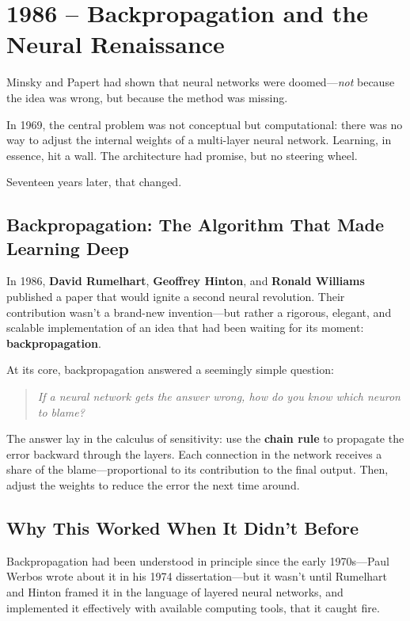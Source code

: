 \section{1986 – Backpropagation and the Neural Renaissance}

Minsky and Papert had shown that neural networks were doomed—\emph{not} because the idea was wrong, but because the method was missing.

In 1969, the central problem was not conceptual but computational: there was no way to adjust the internal weights of a multi-layer neural network. Learning, in essence, hit a wall. The architecture had promise, but no steering wheel.

Seventeen years later, that changed.

\subsection{Backpropagation: The Algorithm That Made Learning Deep}

In 1986, \textbf{David Rumelhart}, \textbf{Geoffrey Hinton}, and \textbf{Ronald Williams} published a paper that would ignite a second neural revolution. Their contribution wasn’t a brand-new invention—but rather a rigorous, elegant, and scalable implementation of an idea that had been waiting for its moment: \textbf{backpropagation}.

At its core, backpropagation answered a seemingly simple question:
\begin{quote}
\textit{If a neural network gets the answer wrong, how do you know which neuron to blame?}
\end{quote}

The answer lay in the calculus of sensitivity: use the \textbf{chain rule} to propagate the error backward through the layers. Each connection in the network receives a share of the blame—proportional to its contribution to the final output. Then, adjust the weights to reduce the error the next time around.

\subsection{Why This Worked When It Didn’t Before}

Backpropagation had been understood in principle since the early 1970s—Paul Werbos wrote about it in his 1974 dissertation—but it wasn’t until Rumelhart and Hinton framed it in the language of layered neural networks, and implemented it effectively with available computing tools, that it caught fire.


